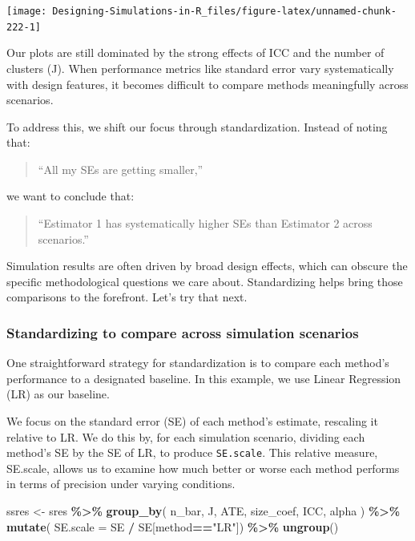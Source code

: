 \documentclass[
]{book}
\newenvironment{Shaded}{\begin{snugshade}}{\end{snugshade}}
\newcommand{\AttributeTok}[1]{\textcolor[rgb]{0.13,0.29,0.53}{#1}}
\newcommand{\FunctionTok}[1]{\textcolor[rgb]{0.13,0.29,0.53}{\textbf{#1}}}
\newcommand{\NormalTok}[1]{#1}
\newcommand{\OtherTok}[1]{\textcolor[rgb]{0.56,0.35,0.01}{#1}}
\newcommand{\SpecialCharTok}[1]{\textcolor[rgb]{0.81,0.36,0.00}{\textbf{#1}}}
\newcommand{\StringTok}[1]{\textcolor[rgb]{0.31,0.60,0.02}{#1}}
\begin{document}
\begin{center}\texttt{[image: Designing-Simulations-in-R\_files/figure-latex/unnamed-chunk-222-1]} \end{center}

Our plots are still dominated by the strong effects of ICC and the number of clusters (J). When performance metrics like standard error vary systematically with design features, it becomes difficult to compare methods meaningfully across scenarios.

To address this, we shift our focus through standardization. Instead of noting that:

\begin{quote}
``All my SEs are getting smaller,''
\end{quote}

we want to conclude that:

\begin{quote}
``Estimator 1 has systematically higher SEs than Estimator 2 across scenarios.''
\end{quote}

Simulation results are often driven by broad design effects, which can obscure the specific methodological questions we care about. Standardizing helps bring those comparisons to the forefront.
Let's try that next.

\subsubsection{Standardizing to compare across simulation scenarios}\label{standardizing-to-compare-across-simulation-scenarios}

One straightforward strategy for standardization is to compare each method's performance to a designated baseline. In this example, we use Linear Regression (LR) as our baseline.

We focus on the standard error (SE) of each method's estimate, rescaling it relative to LR.
We do this by, for each simulation scenario, dividing each method's SE by the SE of LR, to produce \texttt{SE.scale}.
This relative measure, SE.scale, allows us to examine how much better or worse each method performs in terms of precision under varying conditions.

\begin{Shaded}
\begin{Highlighting}[]
\NormalTok{ssres }\OtherTok{\textless{}{-}} 
\NormalTok{  sres }\SpecialCharTok{\%\textgreater{}\%} 
  \FunctionTok{group\_by}\NormalTok{( n\_bar, J, ATE, size\_coef, ICC, alpha ) }\SpecialCharTok{\%\textgreater{}\%}
  \FunctionTok{mutate}\NormalTok{( }\AttributeTok{SE.scale =}\NormalTok{ SE }\SpecialCharTok{/}\NormalTok{ SE[method}\SpecialCharTok{==}\StringTok{"LR"}\NormalTok{]) }\SpecialCharTok{\%\textgreater{}\%}
  \FunctionTok{ungroup}\NormalTok{()}
\end{Highlighting}
\end{Shaded}
\end{document}
